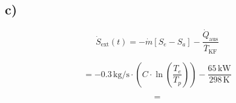 

\subsection*{c)}
\[
\dot{S}_{\text{ext}}(t) = -\dot{m} \left[ S_e - S_a \right] - \frac{\dot{Q}_{\text{aus}}}{\overline{T}_{\text{KF}}}
\]

\[
= -0.3 \, \text{kg/s} \cdot \left( C \cdot \ln \left( \frac{T_e}{T_p} \right) \right) - \frac{65 \, \text{kW}}{298 \, \text{K}}
\]

\[
=
\]